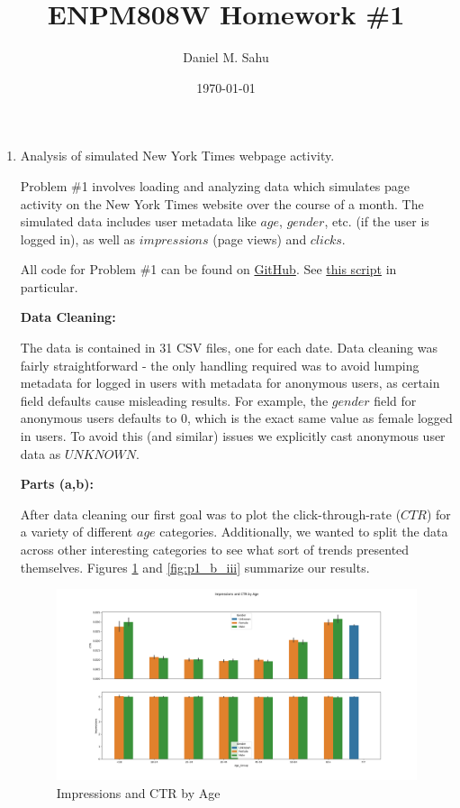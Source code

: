 \documentclass[12pt]{article}
\title{ENPM808W Homework \#1}
\author{Daniel M. Sahu}
\date{\today}
\begin{document}
\maketitle
\begin{enumerate}[leftmargin=\labelsep]
\item Analysis of simulated New York Times webpage activity.

  Problem \#1 involves loading and analyzing data which simulates page activity on the New York Times
  website over the course of a month. The simulated data includes user metadata like $age$, $gender$, etc.
  (if the user is logged in), as well as $impressions$ (page views) and $clicks$.
  
  All code for Problem \#1 can be found on \href{https://github.com/danielmohansahu/data-science-exercises/tree/main/hw1}{GitHub}.
  See \href{https://github.com/danielmohansahu/data-science-exercises/blob/main/hw1/analyze_nyt.py}{this script} in particular.
  
  \textbf{Data Cleaning:}
  
  The data is contained in 31 CSV files, one for each date. Data cleaning was fairly straightforward - the only
  handling required was to avoid lumping metadata for logged in users with metadata for anonymous users, as certain
  field defaults cause misleading results. For example, the $gender$ field for anonymous users defaults to $0$, which
  is the exact same value as female logged in users. To avoid this (and similar) issues we explicitly cast
  anonymous user data as $UNKNOWN$.

  \textbf{Parts (a,b):}
  
  After data cleaning our first goal was to plot the click-through-rate ($CTR$) for a variety of different $age$ categories.
  Additionally, we wanted to split the data across other interesting categories to see what sort of trends presented
  themselves. Figures \ref{fig:p1_b_i} and \ref{fig:p1_b_iii} summarize our results.
  
  \begin{figure}[htb]
    \begin{center}
      \includegraphics[width=\textwidth]{media/p1_b_i.png}
    \end{center}
    \caption{Impressions and CTR by Age}
    \label{fig:p1_b_i}
  \end{figure}
 

\end{enumerate}
\end{document}
